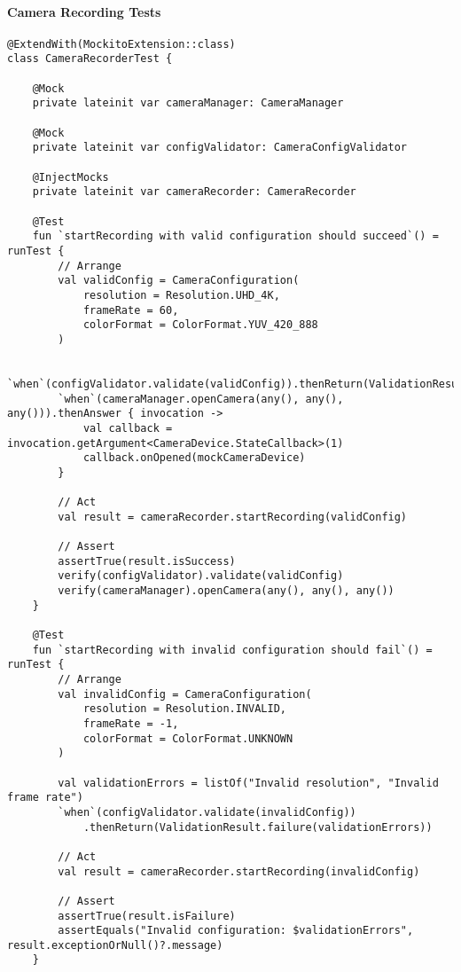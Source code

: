 \documentclass[11pt,a4paper]{report}
\begin{document}
\paragraph{Camera Recording Tests}

\begin{verbatim}
@ExtendWith(MockitoExtension::class)
class CameraRecorderTest {

    @Mock
    private lateinit var cameraManager: CameraManager

    @Mock
    private lateinit var configValidator: CameraConfigValidator

    @InjectMocks
    private lateinit var cameraRecorder: CameraRecorder

    @Test
    fun `startRecording with valid configuration should succeed`() = runTest {
        // Arrange
        val validConfig = CameraConfiguration(
            resolution = Resolution.UHD_4K,
            frameRate = 60,
            colorFormat = ColorFormat.YUV_420_888
        )

        `when`(configValidator.validate(validConfig)).thenReturn(ValidationResult.success())
        `when`(cameraManager.openCamera(any(), any(), any())).thenAnswer { invocation ->
            val callback = invocation.getArgument<CameraDevice.StateCallback>(1)
            callback.onOpened(mockCameraDevice)
        }

        // Act
        val result = cameraRecorder.startRecording(validConfig)

        // Assert
        assertTrue(result.isSuccess)
        verify(configValidator).validate(validConfig)
        verify(cameraManager).openCamera(any(), any(), any())
    }

    @Test
    fun `startRecording with invalid configuration should fail`() = runTest {
        // Arrange
        val invalidConfig = CameraConfiguration(
            resolution = Resolution.INVALID,
            frameRate = -1,
            colorFormat = ColorFormat.UNKNOWN
        )

        val validationErrors = listOf("Invalid resolution", "Invalid frame rate")
        `when`(configValidator.validate(invalidConfig))
            .thenReturn(ValidationResult.failure(validationErrors))

        // Act
        val result = cameraRecorder.startRecording(invalidConfig)

        // Assert
        assertTrue(result.isFailure)
        assertEquals("Invalid configuration: $validationErrors", result.exceptionOrNull()?.message)
    }


\end{verbatim}
\end{document}
